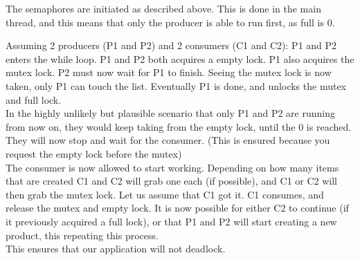 The semaphores are initiated as described above. This is done in the main thread, and this means that only the producer is able to run first, as full is 0.

Assuming 2 producers (P1 and P2) and 2 consumers (C1 and C2):
P1 and P2 enters the while loop. P1 and P2 both acquires a empty lock. P1 also acquires the mutex lock. P2 must now wait for P1 to finish.
Seeing the mutex lock is now taken, only P1 can touch the list. Eventually P1 is done, and unlocks the mutex and full lock. \\

In the highly unlikely but plausible scenario that only P1 and P2 are running from now on, they would keep taking from the empty lock, until the 0 is reached. They will now stop and wait for the consumer. (This is ensured because you request the empty lock before the mutex)\\

The consumer is now allowed to start working. Depending on how many items that are created C1 and C2 will grab one each (if possible), and C1 or C2 will then grab the mutex lock. Let us assume that C1 got it.
C1 consumes, and release the mutex and empty lock. 
It is now possible for either C2 to continue (if it previously acquired a full lock), or that P1 and P2 will start creating a new product, this repeating this process. \\

This ensures that our application will not deadlock.
